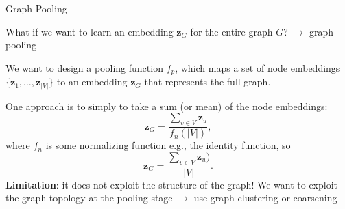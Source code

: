 \documentclass[10pt, aspectratio=169, compress, protectframetitle, handout]{beamer}
\begin{document}
\begin{frame}{Graph Pooling}

    What if we want to learn an embedding $\mathbf z_G$ for the entire graph $G$? $\longrightarrow$ \alert{graph pooling}
    
    We want to design a pooling function $f_p$, which maps a set of node embeddings $\{\mathbf z_1, \ldots, \mathbf z_{|V|} \}$ to an embedding $\mathbf z_G$ that represents the full graph.
    
    One approach is to simply to take a sum (or mean) of the node embeddings:
    \begin{equation}
        \mathbf z_G = \frac{\sum_{v \in V} \mathbf z_u}{f_n(|V|)},
    \end{equation}
    where $f_n$ is some normalizing function e.g., the identity function, so
    \begin{equation}
        \mathbf z_G = \frac{\sum_{v \in V} \mathbf z_u)}{|V|}.
    \end{equation}
    \textbf{Limitation}: it does not exploit the structure of the graph! We want to exploit the graph topology at the pooling stage $\longrightarrow$ use \alert{graph clustering or coarsening}
    
\end{frame}
\end{document}
